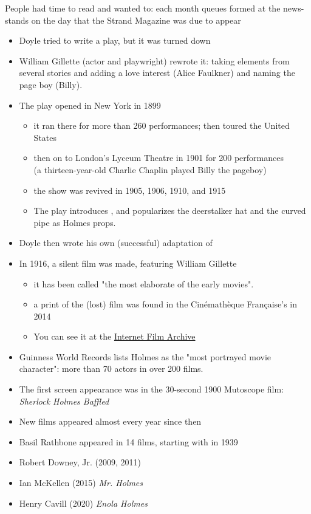 \documentclass[a4paper,landscape,headrule,footrule,xetex]{foils}
\begin{document}
People had time to read and wanted to: each month queues formed at the
news-stands on the day that the Strand Magazine was due to appear





\begin{itemize} \addtolength{\itemsep}{-1ex}
\item Doyle tried to write a play, but it was turned down 
\item William Gillette (actor and playwright) rewrote it: taking
  elements from several stories and adding a love interest (Alice
  Faulkner) and naming the page boy (Billy).
\item The play opened in New York in 1899 
  \begin{itemize}
  \item it ran there for more than 260 performances; then toured the United States
  \item then on to  London's Lyceum Theatre in 1901 for 200 performances
    \\ (a thirteen-year-old Charlie Chaplin played Billy the pageboy)
  \item the show was revived in 1905, 1906, 1910, and 1915
  \item The play introduces , and
    popularizes the deerstalker hat 
    and the curved pipe as Holmes props.
  \end{itemize}
\item Doyle then wrote his own (successful) adaptation of 
  \newpage
\item In 1916, a silent film was made, featuring  William Gillette
  \begin{itemize}
  \item it has been called "the most elaborate of the early movies".
  \item  a print of the (lost) film was found in the Cinémathèque Française's in 2014
\item You can see it at the
  \href{https://archive.org/details/SherlockHolmes1916}{Internet Film Archive}
  \end{itemize}
\end{itemize}


\begin{itemize}
\item Guinness World Records lists Holmes as the "most portrayed movie
  character": more than 70 actors in over 200 films.
\item The first screen appearance was in the 30-second 1900 Mutoscope film: \textit{Sherlock Holmes Baffled}
\item New films appeared almost every year since then 
\item Basil Rathbone appeared in 14 films, starting with  in 1939
\item Robert Downey, Jr. (2009, 2011)
\item Ian McKellen (2015) \textit{Mr. Holmes}
\item   Henry Cavill (2020) \textit{Enola Holmes}
\end{itemize}
\end{document}
